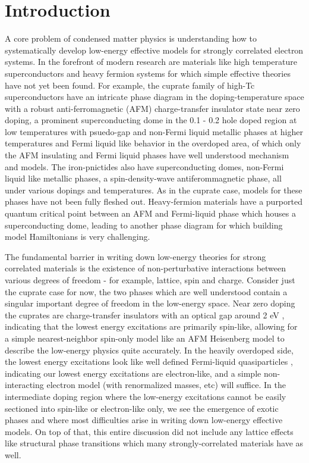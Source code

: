 \documentclass[12pt]{article}
\begin{document}
\section{Introduction}
A core problem of condensed matter physics is understanding how to systematically develop low-energy effective models for strongly correlated electron systems. In the forefront of modern research are materials like high temperature superconductors and heavy fermion systems for which simple effective theories have not yet been found. For example, the cuprate family of high-Tc superconductors have an intricate phase diagram in the doping-temperature space  with a robust anti-ferromagnetic (AFM) charge-transfer insulator state near zero doping, a prominent superconducting dome in the 0.1 - 0.2 hole doped region at low temperatures with psuedo-gap and non-Fermi liquid metallic phases at higher temperatures and Fermi liquid like behavior in the overdoped area, of which only the AFM insulating and Fermi liquid phases have well understood mechanism and models. The iron-pnictides also have superconducting domes, non-Fermi liquid like metallic phases, a spin-density-wave antiferommagnetic phase, all under various dopings and temperatures. As in the cuprate case, models for these phases have not been fully fleshed out. Heavy-fermion materials have a purported quantum critical point between an AFM and Fermi-liquid phase which houses a superconducting dome, leading to another phase diagram for which building model Hamiltonians is very challenging. 

The fundamental barrier in writing down low-energy theories for strong correlated materials is the existence of non-perturbative interactions between various degrees of freedom - for example, lattice, spin and charge. Consider just the cuprate case for now, the two phases which are well understood contain a singular important degree of freedom in the low-energy space. Near zero doping the cuprates are charge-transfer insulators with an optical gap around 2 eV , indicating that the lowest energy excitations are primarily spin-like, allowing for a simple nearest-neighbor spin-only model like an AFM Heisenberg model to describe the low-energy physics quite accurately. In the heavily overdoped side, the lowest energy excitations look like well defined Fermi-liquid quasiparticles , indicating our lowest energy excitations are electron-like, and a simple non-interacting electron model (with renormalized masses, etc) will suffice. In the intermediate doping region where the low-energy excitations cannot be easily sectioned into spin-like or electron-like only, we see the emergence of exotic phases and where most difficulties arise in writing down low-energy effective models. On top of that, this entire discussion did not include any lattice effects like structural phase transitions which many strongly-correlated materials have as well.
\end{document}
